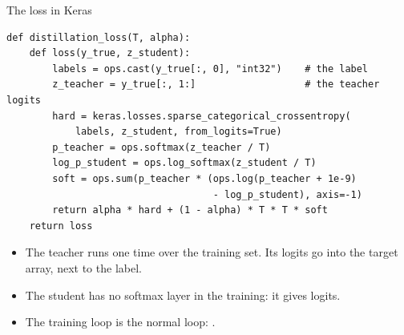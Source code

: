 \begin{frame}[fragile]{The loss in Keras}
\begin{lstlisting}[style=python]
def distillation_loss(T, alpha):
    def loss(y_true, z_student):
        labels = ops.cast(y_true[:, 0], "int32")    # the label
        z_teacher = y_true[:, 1:]                   # the teacher logits
        hard = keras.losses.sparse_categorical_crossentropy(
            labels, z_student, from_logits=True)
        p_teacher = ops.softmax(z_teacher / T)
        log_p_student = ops.log_softmax(z_student / T)
        soft = ops.sum(p_teacher * (ops.log(p_teacher + 1e-9)
                                    - log_p_student), axis=-1)
        return alpha * hard + (1 - alpha) * T * T * soft
    return loss
\end{lstlisting}
  \small
  \begin{itemize}
    \item The teacher runs one time over the training set. Its logits go
          into the target array, next to the label.
    \item The student has no softmax layer in the training: it gives
          logits.
    \item The training loop is the normal loop: .
  \end{itemize}
\end{frame}

